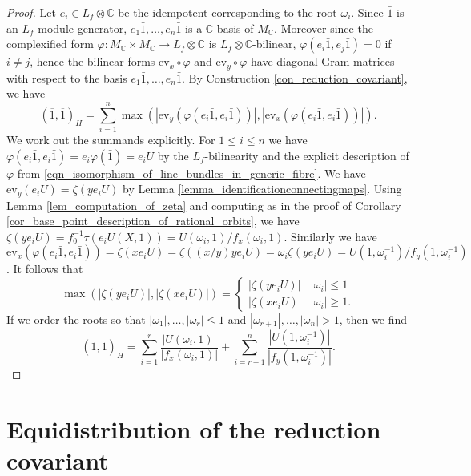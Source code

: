\documentclass{article} %
\numberwithin{equation}{section}
\begin{document}
\begin{proof}
    Let  $e_i \in L_f \otimes \mathbb{C}$ be the idempotent corresponding to the root $\omega_i$.
    Since $\bar{1}$ is an $L_f$-module generator, $e_1 \bar{1}, \dots,e_n\bar{1}$ is a $\mathbb{C}$-basis of $M_{\mathbb{C}}$. 
    Moreover since the complexified form $\varphi\colon M_{\mathbb{C}}\times M_{\mathbb{C}}\rightarrow L_f\otimes \mathbb{C}$ is $L_f\otimes \mathbb{C}$-bilinear, $\varphi(e_i \bar{1},e_j\bar{1}) = 0$ if $i\neq j$, hence the bilinear forms $\mathrm{ev}_x\circ \varphi$ and $\mathrm{ev}_y \circ \varphi$ have diagonal Gram matrices with respect to the basis $e_1\bar{1} , \dots, e_ n\bar{1}$.
    By Construction \ref{con_reduction_covariant}, we have
    \[ (\overline{1},\overline{1})_H = \sum_{i=1}^n \max( | \mathrm{ev}_y(\varphi(e_i\bar{1}, e_i\bar{1}))|, | \mathrm{ev}_x(\varphi(e_i\bar{1}, e_i\bar{1})) | ).   \]
    We work out the summands explicitly. 
    For $1\leq i \leq n$ we have $\varphi(e_i \bar{1}, e_i \bar{1}) = e_i \varphi(\bar{1}) = e_i U$ by the $L_f$-bilinearity and the explicit description of $\varphi$ from \eqref{eqn_isomorphism_of_line_bundles_in_generic_fibre}.
    We have $\mathrm{ev}_y(e_i U) = \zeta(ye_i U)$ by Lemma \ref{lemma_identificationconnectingmaps}. 
    Using Lemma \ref{lem_computation_of_zeta} and computing as in the proof of Corollary \ref{cor_base_point_description_of_rational_orbits}, we have $\zeta(y e_i U) = f_0^{-1} \tau( e_i U(X, 1) ) = U(\omega_i, 1) / f_x(\omega_i, 1)$.
    Similarly we have $\mathrm{ev}_x(\varphi(e_i\bar{1},e_i\bar{1})) = \zeta(x e_i U) = \zeta(( x / y ) y e_i U) = \omega_i \zeta(y e_i U) = U(1,\omega_i^{-1})/f_y(1,\omega_i^{-1})$. It follows that
\[ \max( | \zeta(y e_i U) |, | \zeta(x e_i U) | ) = \left\{ \begin{array}{cc} | \zeta(y e_i U) | & | \omega_i | \leq 1
\\ | \zeta(x e_i U) | & | \omega_i | \geq 1. \end{array} \right. \]
If we order the roots so that $| \omega_1 |, \dots, | \omega_r | \leq 1$ and $ | \omega_{r+1} |, \dots, |\omega_n | > 1$, then we find
\[ (\overline{1},\overline{1})_H = \sum_{i=1}^r \frac{| U(\omega_i, 1) |}{| f_x(\omega_i, 1)|} + \sum_{i=r+1}^n \frac{| U(1, \omega_i^{-1}) |}{| f_y(1, \omega_i^{-1})|}.  \]
\end{proof}






\section{Equidistribution of the reduction covariant}\label{sec: equidistribution}
\end{document}
